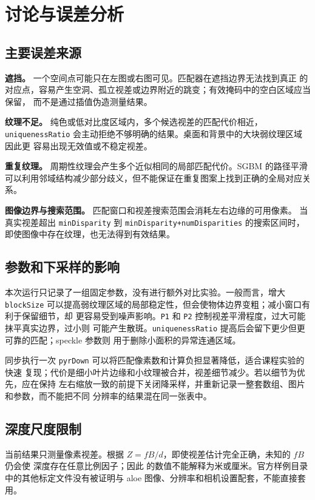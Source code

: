 \section{讨论与误差分析}

\subsection{主要误差来源}

\textbf{遮挡。} 一个空间点可能只在左图或右图可见。匹配器在遮挡边界无法找到真正
的对应点，容易产生空洞、孤立视差或边界附近的跳变；有效掩码中的空白区域应当保留，
而不是通过插值伪造测量结果。

\textbf{纹理不足。} 纯色或低对比度区域内，多个候选视差的匹配代价相近，
\texttt{uniquenessRatio} 会主动拒绝不够明确的结果。桌面和背景中的大块弱纹理区域因此更
容易出现无效值或不稳定视差。

\textbf{重复纹理。} 周期性纹理会产生多个近似相同的局部匹配代价。SGBM 的路径平滑
可以利用邻域结构减少部分歧义，但不能保证在重复图案上找到正确的全局对应关系。

\textbf{图像边界与搜索范围。} 匹配窗口和视差搜索范围会消耗左右边缘的可用像素。
当真实视差超出 \texttt{minDisparity} 到 \texttt{minDisparity+numDisparities} 的搜索区间时，
即使图像中存在纹理，也无法得到有效结果。

\subsection{参数和下采样的影响}

本次运行只记录了一组固定参数，没有进行额外对比实验。一般而言，增大 \texttt{blockSize}
可以提高弱纹理区域的局部稳定性，但会使物体边界变粗；减小窗口有利于保留细节，却
更容易受到噪声影响。\texttt{P1} 和 \texttt{P2} 控制视差平滑程度，过大可能抹平真实边界，过小则
可能产生散斑。\texttt{uniquenessRatio} 提高后会留下更少但更可靠的匹配；speckle 参数则
用于删除小面积的异常连通区域。

同步执行一次 \texttt{pyrDown} 可以将匹配像素数和计算负担显著降低，适合课程实验的快速
复现；代价是细小叶片边缘和小纹理被合并，视差细节减少。若以细节为优先，应在保持
左右缩放一致的前提下关闭降采样，并重新记录一整套数组、图片和参数，而不能把不同
分辨率的结果混在同一张表中。

\subsection{深度尺度限制}

当前结果只测量像素视差。根据 $Z=fB/d$，即使视差估计完全正确，未知的 $fB$ 仍会使
深度存在任意比例因子；因此  的数值不能解释为米或厘米。官方样例目录
中的其他标定文件没有被证明与 aloe 图像、分辨率和相机设置配套，不能直接套用。

